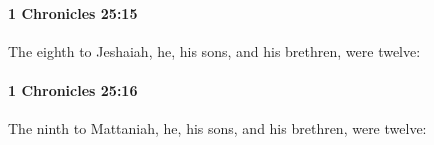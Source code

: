 		\paragraph{1 Chronicles 25:15} %
			\label{1CHRONICLES-25-15}

			The eighth to Jeshaiah, he, his sons, and his brethren, were twelve:


		\paragraph{1 Chronicles 25:16} %
			\label{1CHRONICLES-25-16}

			The ninth to Mattaniah, he, his sons, and his brethren, were twelve:



